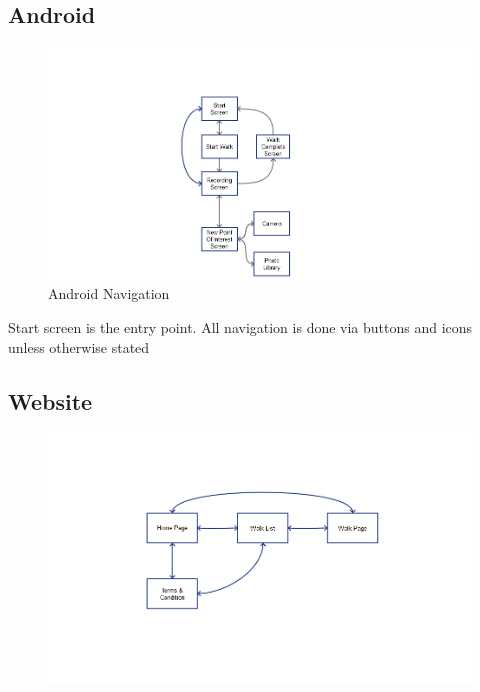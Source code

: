 \documentclass[12pt]{article}
\begin{document}
{\subsection{Android}
\begin{figure}[htp]
\begin{adjustwidth}{-3.cm}{-4cm}
\centering
\includegraphics[scale=0.6]{Project_Plan/docs/android_navigation_01.png}
\caption{Android Navigation}
\label{Android Navigation}
\end{adjustwidth}
\end{figure}
\par{Start screen is the entry point. All navigation is done via buttons and icons unless otherwise stated}
\clearpage
\subsection{Website}
\begin{figure}[htp]
\begin{adjustwidth}{-3cm}{-3cm}
\centering
\includegraphics[scale=0.6]{Project_Plan/docs/website_navigation_01.png}


\end{adjustwidth}
\end{figure}}
\end{document}
